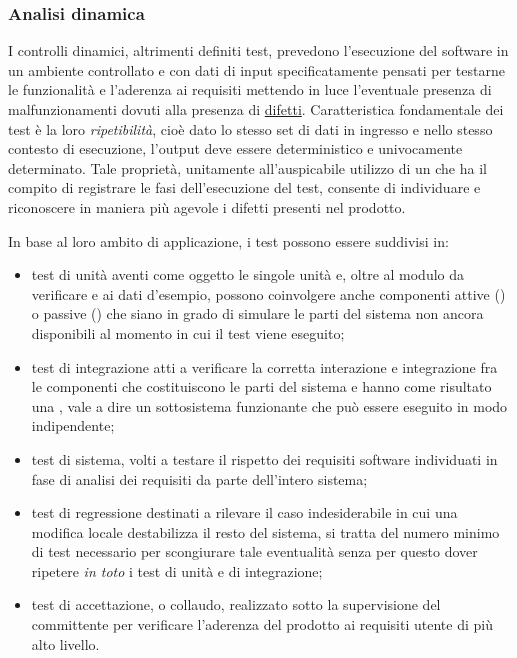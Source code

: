 {\subsubsection{Analisi dinamica}
I controlli dinamici, altrimenti definiti test, prevedono l'esecuzione del software in un ambiente controllato e con dati di input specificatamente pensati per testarne le funzionalità e l'aderenza ai requisiti mettendo in luce l'eventuale presenza di malfunzionamenti dovuti alla presenza di \underline{difetti}. Caratteristica fondamentale dei test è la loro \emph{ripetibilità}, cioè dato lo stesso set di dati in ingresso e nello stesso contesto di esecuzione, l'output deve essere deterministico e univocamente determinato. Tale proprietà, unitamente all'auspicabile utilizzo di un  che ha il compito di registrare le fasi dell'esecuzione del test, consente di individuare e riconoscere in maniera più agevole i difetti presenti nel prodotto.

In base al loro ambito di applicazione, i test possono essere suddivisi in:
\begin{itemize}
  \item test di unità aventi come oggetto le singole unità e, oltre al modulo da verificare e ai dati d'esempio, possono coinvolgere anche componenti attive () o passive () che siano in grado di simulare le parti del sistema non ancora disponibili al momento in cui il test viene eseguito;
  \item test di integrazione atti a verificare la corretta interazione e integrazione fra le componenti che costituiscono le parti del sistema e hanno come risultato una , vale a dire un sottosistema funzionante che può essere eseguito in modo indipendente;
  \item test di sistema, volti a testare il rispetto dei requisiti software individuati in fase di analisi dei requisiti da parte dell'intero sistema; 
  \item test di regressione destinati a rilevare il caso indesiderabile in cui una modifica locale destabilizza il resto del sistema, si tratta del numero minimo di test necessario per scongiurare tale eventualità senza per questo dover ripetere \emph{in toto} i test di unità e di integrazione;
  \item test di accettazione, o collaudo, realizzato sotto la supervisione del committente per verificare l'aderenza del prodotto ai requisiti utente di più alto livello.
\end{itemize}

}
